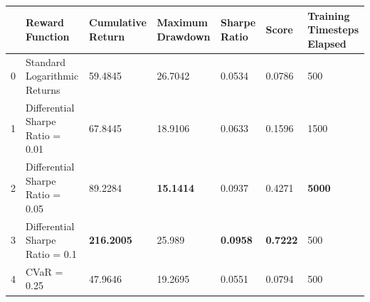 \begin{tabular}{lllllll}
\toprule
 & Reward Function & Cumulative Return & Maximum Drawdown & Sharpe Ratio & Score & Training Timesteps Elapsed \\
\midrule
0 & Standard Logarithmic Returns & 59.4845 & 26.7042 & 0.0534 & 0.0786 & 500 \\
1 & Differential Sharpe Ratio = 0.01 & 67.8445 & 18.9106 & 0.0633 & 0.1596 & 1500 \\
2 & Differential Sharpe Ratio = 0.05 & 89.2284 & \textbf{15.1414} & 0.0937 & 0.4271 & \textbf{5000} \\
3 & Differential Sharpe Ratio = 0.1 & \textbf{216.2005} & 25.989 & \textbf{0.0958} & \textbf{0.7222} & 500 \\
4 & CVaR = 0.25 & 47.9646 & 19.2695 & 0.0551 & 0.0794 & 500 \\
\bottomrule
\end{tabular}
